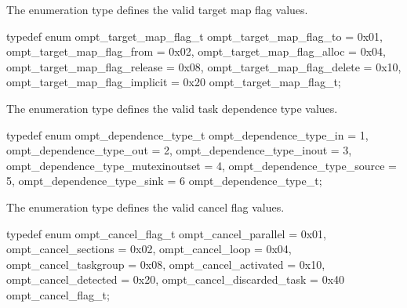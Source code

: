 \label{sec:ompt_target_map_flag_t}

\summary
The  enumeration type defines the valid target 
map flag values.

\format
\begin{ccppspecific}
\begin{omptEnum}
typedef enum ompt_target_map_flag_t {
  ompt_target_map_flag_to             = 0x01,
  ompt_target_map_flag_from           = 0x02,
  ompt_target_map_flag_alloc          = 0x04,
  ompt_target_map_flag_release        = 0x08,
  ompt_target_map_flag_delete         = 0x10,
  ompt_target_map_flag_implicit       = 0x20
} ompt_target_map_flag_t;
\end{omptEnum}
\end{ccppspecific}



\label{sec:ompt_dependence_type_t}

\summary
The  enumeration type defines the valid task dependence 
type values.

\format
\begin{ccppspecific}
\begin{omptEnum}
typedef enum ompt_dependence_type_t {
  ompt_dependence_type_in              = 1,
  ompt_dependence_type_out             = 2,
  ompt_dependence_type_inout           = 3,
  ompt_dependence_type_mutexinoutset   = 4,
  ompt_dependence_type_source          = 5,
  ompt_dependence_type_sink            = 6
} ompt_dependence_type_t;
\end{omptEnum}
\end{ccppspecific}



\label{sec:ompt_cancel_flag_t}

\summary
The  enumeration type defines the valid cancel flag values.

\format
\begin{ccppspecific}
\begin{omptEnum}
typedef enum ompt_cancel_flag_t {
  ompt_cancel_parallel       = 0x01,
  ompt_cancel_sections       = 0x02,
  ompt_cancel_loop           = 0x04,
  ompt_cancel_taskgroup      = 0x08,
  ompt_cancel_activated      = 0x10,
  ompt_cancel_detected       = 0x20,
  ompt_cancel_discarded_task = 0x40
} ompt_cancel_flag_t;
\end{omptEnum}
\end{ccppspecific}



